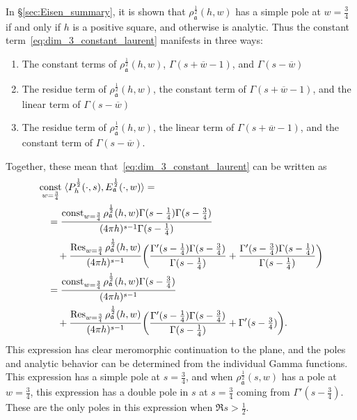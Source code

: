 In \S\ref{sec:Eisen_summary}, it is shown that $\rho_\mathfrak{a}^{\frac{1}{2}}(h,w)$
has a simple pole at $w = \frac{3}{4}$ if and only if $h$ is a positive square,
and otherwise is analytic.
Thus the constant term~\eqref{eq:dim_3_constant_laurent} manifests in three ways:
\begin{enumerate}
  \item The constant terms of $\rho_{\mathfrak{a}}^{\frac{1}{2}}(h,w)$,
    $\Gamma(s + \overline{w} - 1)$, and $\Gamma(s - \overline{w})$
  \item The residue term of $\rho_{\mathfrak{a}}^{\frac{1}{2}}(h,w)$,
    the constant term of $\Gamma(s + \overline{w} - 1)$,
    and the linear term of $\Gamma(s - \overline{w})$
  \item The residue term of $\rho_{\mathfrak{a}}^{\frac{1}{2}}(h,w)$,
    the linear term of $\Gamma(s + \overline{w} - 1)$,
    and the constant term of $\Gamma(s - \overline{w})$.
\end{enumerate}
Together, these mean that~\eqref{eq:dim_3_constant_laurent} can be written as
\begin{equation} \label{eq:dim_3_laurent_simplify_I}
  \begin{split}
    &\operatorname*{const}_{w = \frac{3}{4}} \; \langle P_h^{\frac{1}{2}} (\cdot, s),
    E_\mathfrak{a}^{\frac{1}{2}} (\cdot, w) \rangle = \\
    &\quad = \frac{\operatorname*{const}_{w = \frac{3}{4}}
    \rho_\mathfrak{a}^{\frac{1}{2}}(h,w)
    \Gamma(s - \frac{1}{4})\Gamma(s - \frac{3}{4})}
    {(4\pi h)^{s-1} \Gamma(s - \frac{1}{4})}
    \\
    &\qquad + \frac{\operatorname*{Res}_{w = \frac{3}{4}}
    \rho_{\mathfrak{a}}^{\frac{1}{2}}(h,w)}{(4\pi h)^{s-1}}
    \bigg( \frac{\Gamma'(s - \frac{1}{4}) \Gamma(s - \frac{3}{4})}
      {\Gamma(s - \frac{1}{4})}
      +
    \frac{\Gamma'(s - \frac{3}{4}) \Gamma(s - \frac{1}{4})}{\Gamma(s - \frac{1}{4})}\bigg)
    \\
    &\quad =\frac{\operatorname*{const}_{w = \frac{3}{4}} \rho_\mathfrak{a}^{\frac{1}{2}}(h,w)
    \Gamma(s - \frac{3}{4})}{(4\pi h)^{s-1}}
    \\
    &\qquad + \frac{\operatorname*{Res}_{w = \frac{3}{4}}
    \rho_{\mathfrak{a}}^{\frac{1}{2}}(h,w)}{(4\pi h)^{s-1}}
    \bigg( \frac{\Gamma'(s - \frac{1}{4}) \Gamma(s - \tfrac{3}{4})}
      {\Gamma(s - \frac{1}{4})}
      +
    \Gamma'(s - \tfrac{3}{4})\bigg).
  \end{split}
\end{equation}
This expression has clear meromorphic continuation to the plane, and the poles and
analytic behavior can be determined from the individual Gamma functions.
This expression has a simple pole at $s = \frac{3}{4}$, and when
$\rho_\mathfrak{a}^{\frac{1}{2}}(s,w)$ has a pole at $w = \frac{3}{4}$, this
expression has a double pole in $s$ at $s = \frac{3}{4}$ coming
from $\Gamma'(s - \frac{3}{4})$.
These are the only poles in this expression when $\Re s > \frac{1}{2}$.




